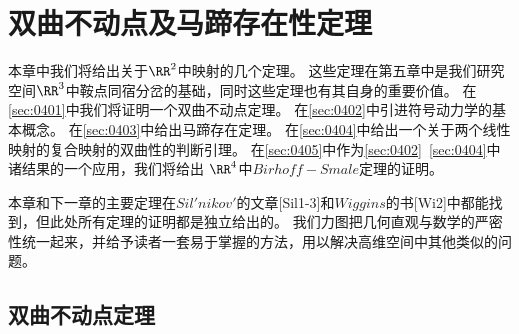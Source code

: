 \chapter{双曲不动点及马蹄存在性定理}

本章中我们将给出关于$\RR^2$中映射的几个定理。
这些定理在第五章中是我们研究空间$\RR^3$中鞍点同宿分岔的基础，同时这些定理也有其自身的重要价值。
在\ref{sec:0401}中我们将证明一个双曲不动点定理。
在\ref{sec:0402}中引进符号动力学的基本概念。
在\ref{sec:0403}中给出马蹄存在定理。
在\ref{sec:0404}中给出一个关于两个线性映射的复合映射的双曲性的判断引理。
在\ref{sec:0405}中作为\ref{sec:0402}~\ref{sec:0404}中诸结果的一个应用，我们将给出
$\RR^4$中$Birhoff-Smale$定理的证明。
\par
本章和下一章的主要定理在$Sil'nikov'$的文章[Sil1-3]和$Wiggins$的书[Wi2]中都能找到，但此处所有定理的证明都是独立给出的。
我们力图把几何直观与数学的严密性统一起来，并给予读者一套易于掌握的方法，用以解决高维空间中其他类似的问题。
\section{双曲不动点定理}
